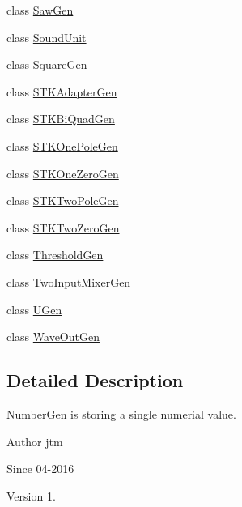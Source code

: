 \begin{DoxyCompactItemize}
class \hyperlink{classunit_1_1SawGen}{Saw\+Gen}
\item 
class \hyperlink{classunit_1_1SoundUnit}{Sound\+Unit}
\item 
class \hyperlink{classunit_1_1SquareGen}{Square\+Gen}
\item 
class \hyperlink{classunit_1_1STKAdapterGen}{S\+T\+K\+Adapter\+Gen}
\item 
class \hyperlink{classunit_1_1STKBiQuadGen}{S\+T\+K\+Bi\+Quad\+Gen}
\item 
class \hyperlink{classunit_1_1STKOnePoleGen}{S\+T\+K\+One\+Pole\+Gen}
\item 
class \hyperlink{classunit_1_1STKOneZeroGen}{S\+T\+K\+One\+Zero\+Gen}
\item 
class \hyperlink{classunit_1_1STKTwoPoleGen}{S\+T\+K\+Two\+Pole\+Gen}
\item 
class \hyperlink{classunit_1_1STKTwoZeroGen}{S\+T\+K\+Two\+Zero\+Gen}
\item 
class \hyperlink{classunit_1_1ThresholdGen}{Threshold\+Gen}
\item 
class \hyperlink{classunit_1_1TwoInputMixerGen}{Two\+Input\+Mixer\+Gen}
\item 
class \hyperlink{classunit_1_1UGen}{U\+Gen}
\item 
class \hyperlink{classunit_1_1WaveOutGen}{Wave\+Out\+Gen}
\end{DoxyCompactItemize}


\subsection{Detailed Description}
\hyperlink{classunit_1_1NumberGen}{Number\+Gen} is storing a single numerial value.

\begin{DoxyAuthor}{Author}
jtm 
\end{DoxyAuthor}
\begin{DoxySince}{Since}
04-\/2016 
\end{DoxySince}
\begin{DoxyVersion}{Version}
1. 
\end{DoxyVersion}
